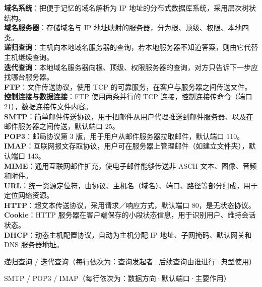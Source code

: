 \documentclass[a4paper,11pt]{article}
\begin{document}
\begin{keyterms}
\textbf{域名系统}：把便于记忆的域名解析为 IP 地址的分布式数据库系统，采用层次树状结构。\\
\textbf{域名服务器}：存储域名与 IP 地址映射的服务器，分为根、顶级、权限、本地四类。\\
\textbf{递归查询}：主机向本地域名服务器的查询，若本地服务器不知道答案，则由它代替主机继续查询。\\
\textbf{迭代查询}：本地域名服务器向根、顶级、权限服务器的查询，对方只告诉下一步应找哪台服务器。\\
\textbf{FTP}：文件传送协议，使用 TCP 的可靠服务，在客户与服务器之间传送文件。\\
\textbf{控制连接与数据连接}：FTP 使用两条并行的 TCP 连接，控制连接传命令（端口 21），数据连接传文件内容。\\
\textbf{SMTP}：简单邮件传送协议，用于把邮件从用户代理推送到邮件服务器、以及在邮件服务器之间传送，默认端口 25。\\
\textbf{POP3}：邮局协议第 3 版，用于用户从邮件服务器拉取邮件，默认端口 110。\\
\textbf{IMAP}：互联网报文存取协议，用户可在服务器上管理邮件（如建立文件夹），默认端口 143。\\
\textbf{MIME}：通用互联网邮件扩充，使电子邮件能够传送非 ASCII 文本、图像、音频和附件。\\
\textbf{URL}：统一资源定位符，由协议、主机名（域名）、端口、路径等部分组成，用于定位网络资源。\\
\textbf{HTTP}：超文本传送协议，采用请求／响应方式，默认端口 80，是无状态协议。\\
\textbf{Cookie}：HTTP 服务器在客户端保存的小段状态信息，用于识别用户、维持会话状态。\\
\textbf{DHCP}：动态主机配置协议，自动为主机分配 IP 地址、子网掩码、默认网关和 DNS 服务器地址。
\end{keyterms}

\begin{contrast}{递归查询 / 迭代查询（每行依次为：查询发起者·后续查询由谁进行·典型使用）}
\end{contrast}

\begin{contrast}{SMTP / POP3 / IMAP（每行依次为：数据方向·默认端口·主要作用）}
\end{contrast}
\end{document}
